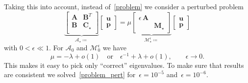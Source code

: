 \documentclass[12pt]{article}
\newcommand{\vect}[1]{\boldsymbol{\mathbf{#1}}}
\begin{document}
Taking this into account, instead of~\eqref{problem} we consider a perturbed\footnotemark{} problem
\begin{equation}\label{problem_pert}
	\underbrace{\begin{bmatrix}
		\vect A & \vect B^T \\
		\vect B & \vect C_\star \\
	\end{bmatrix}}_{\mathcal A_\star \coloneqq}
	\begin{bmatrix}
		\vect u \\
		\vect p
	\end{bmatrix}
	=
	\mu
	\underbrace{\begin{bmatrix}
		\epsilon\,\vect A & \\
		& \vect M_\star
	\end{bmatrix}}_{\mathcal M^\epsilon_\star \coloneqq}
	\begin{bmatrix}
		\vect u \\
		\vect p
	\end{bmatrix}
\end{equation}
with $0 < \epsilon \ll 1$. For $\mathcal A_0$ and $\mathcal M^\epsilon_0$ we have
\begin{equation}
	\mu = -\lambda + o(1)\quad\text{or}\quad\epsilon^{-1} + \lambda + o(1),\qquad\epsilon \rightarrow 0.
\end{equation}
This makes it easy to pick only ``correct'' eigenvalues. To make sure that results are consistent we solved~\eqref{problem_pert} for~$\epsilon = 10^{-5}$ and~$\epsilon = 10^{-6}$.

	
\end{document}
